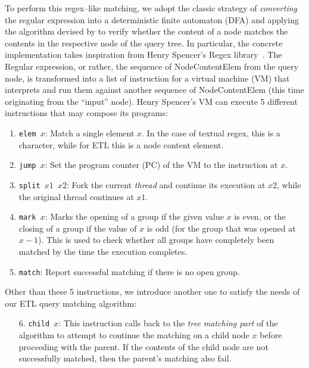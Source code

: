 \begin{chapterBody}
To perform this regex–like matching, we adopt the classic strategy of
\textit{converting} the regular expression into a deterministic finite
automaton (DFA) and applying the algorithm devised by
\citet{thompson_programming_1968} to verify whether the content of a node
matches the contents in the respective node of the query tree. In particular,
the concrete implementation takes inspiration from Henry Spencer's Regex
library~\cite{schumacher_software_1994}. The Regular expression, or rather,
the sequence of NodeContentElem from the query node, is transformed into a list
of instruction for a virtual machine (VM) that interprets and run them against
another sequence of  NodeContentElem (this time originating from the ``input''
node).
Henry Spencer's VM can execute 5 different instructions that may compose its
programs:

\begin{enumerate}
    \item \texttt{elem $x$}: Match a single element $x$. In the case of textual
regex, this is a character, while for ETL this is a node content element.
    \item \texttt{jump $x$}: Set the program counter (PC) of the VM to the
instruction at $x$.
    \item \texttt{split $x1$ $x2$}: Fork the current \textit{thread} and
continue its execution at $x2$, while the original thread continues at $x1$.
    \item \texttt{mark $x$}: Marks the opening of a group if the given value
$x$ is even, or the closing of a group if the value of $x$ is odd (for the
group that was opened at $x-1$). This is used to check whether all groups have
completely been matched by the time the execution completes.
    \item \texttt{match}: Report successful matching if there is no open group.
\end{enumerate}

Other than these 5 instructions, we introduce another one to satisfy the needs
of our ETL query matching algorithm:

\begin{enumerate}
    \item[6.] \texttt{child $x$}: This instruction calls back to the 
\textit{tree matching part} of the algorithm to attempt to continue the
matching on a child node $x$ before proceeding with the parent. If the
contents of the child node are not successfully matched, then the parent's
matching also fail.
\end{enumerate}


\end{chapterBody}
